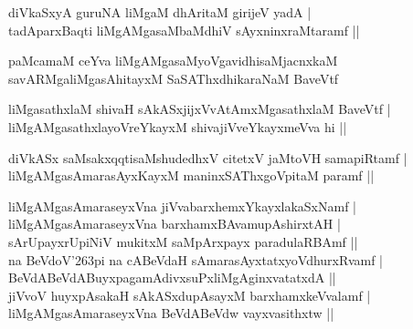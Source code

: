 \begin{entry}
\begin{shl}
diVkaSxyA guruNA liMgaM dhAritaM girijeV yadA |\\
tadAparxBaqti liMgAMgasaMbaMdhiV sAyxninxraMtaramf ||
\end{shl}
\end{entry}

\begin{entry}
\begin{shl}
paMcamaM ceYva liMgAMgasaMyoVgavidhisaMjacnxkaM\\
savARMgaliMgasAhitayxM SaSAThxdhikaraNaM BaveVtf
\end{shl}
\end{entry}

\begin{entry}
\begin{shl}
liMgasathxlaM shivaH sAkASxjijxVvAtAmxMgasathxlaM BaveVtf |\\
liMgAMgasathxlayoVreYkayxM shivajiVveYkayxmeVva hi ||
\end{shl}
\end{entry}

\begin{entry}
\begin{shl}
diVkASx saMsakxqqtisaMshudedhxV citetxV jaMtoVH samapiRtamf |\\
liMgAMgasAmarasAyxKayxM maninxSAThxgoVpitaM paramf ||
\end{shl}
\begin{shl}
liMgAMgasAmaraseyxVna jiVvabarxhemxYkayxlakaSxNamf |\\
liMgAMgasAmaraseyxVna barxhamxBAvamupAshirxtAH |\\
sArUpayxrUpiNiV mukitxM saMpArxpayx paradulaRBAmf ||\\
na BeVdoV{\char'263}pi na cABeVdaH sAmarasAyxtatxyoVdhurxRvamf |\\
BeVdABeVdABuyxpagamAdivxsuPxliMgAginxvatatxdA ||\\
jiVvoV huyxpAsakaH sAkASxdupAsayxM barxhamxkeVvalamf |\\
liMgAMgasAmaraseyxVna BeVdABeVdw vayxvasithxtw ||
\end{shl}
\end{entry}

